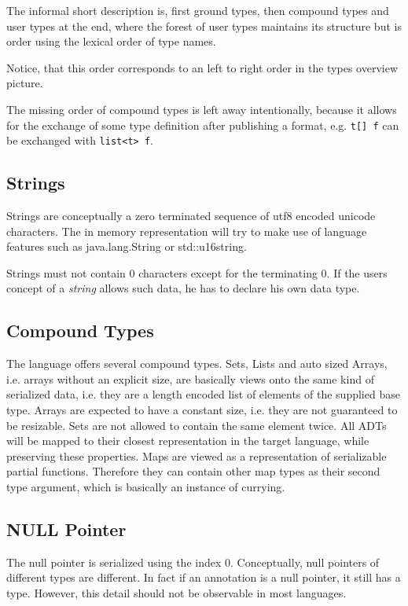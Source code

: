 \documentclass[a4paper,10pt]{article}
\begin{document}
The informal short description is, first ground types, then compound types and user types at the end, where the forest of user types maintains its structure but is order using the lexical order of type names.

Notice, that this order corresponds to an left to right order in the types overview picture.

The missing order of compound types is left away intentionally, because it allows for the exchange of some type definition after publishing a format, e.g. \verb/t[] f/ can be exchanged with \verb/list<t> f/.


\subsection*{Strings}

Strings are conceptually a zero terminated sequence of utf8 encoded unicode characters. The in memory representation will try to make use of language features such as java.lang.String or std::u16string.

Strings must not contain 0 characters except for the terminating 0. If the users concept of a \textit{string} allows such data, he has to declare his own data type.

\subsection*{Compound Types}

The language offers several compound types. Sets, Lists and auto sized Arrays, i.e. arrays without an explicit size, are basically views onto the same kind of serialized data, i.e. they are a length encoded list of elements of the supplied base type. Arrays are expected to have a constant size, i.e. they are not guaranteed to be resizable. Sets are not allowed to contain the same element twice.
All ADTs will be mapped to their closest representation in the target language, while preserving these properties.
Maps are viewed as a representation of serializable partial functions. Therefore they can contain other map types as their second type argument, which is basically an instance of currying.

\subsection*{NULL Pointer}

The null pointer is serialized using the index 0. Conceptually, null pointers of different types are different. In fact if an annotation is a null pointer, it still has a type. However, this detail should not be observable in most languages.
\end{document}
